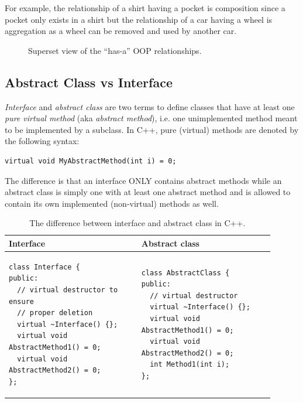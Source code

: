 \documentclass[a4paper]{article}
\begin{document}
For example, the relationship of a shirt having a pocket is composition since a pocket only exists in a shirt but the relationship of a car having a wheel is aggregation as a wheel can be removed and used by another car.

\begin{figure}[ht]
  \centering
  \caption{Superset view of the ``has-a'' OOP relationships.} \label{fig:oop_hasa_superset}
\end{figure}


\subsection{Abstract Class vs Interface}

\textit{Interface} and \textit{abstract class} are two terms to define classes that have at least one \textit{pure virtual method} (aka \textit{abstract method}), i.e. one unimplemented method meant to be implemented by a subclass. In C++, pure (virtual) methods are denoted by the following syntax:
\begin{verbatim}
virtual void MyAbstractMethod(int i) = 0;
\end{verbatim}

The difference is that an interface ONLY contains abstract methods while an abstract class is simply one with at least one abstract method and is allowed to contain its own implemented (non-virtual) methods as well.

\begin{table}[H]
  \centering
  \begin{tabular}{p{0.45\linewidth}|p{0.45\linewidth}}
    \textbf{Interface} & \textbf{Abstract class} \\
    \hline
        \begin{verbatim}
class Interface {
public:
  // virtual destructor to ensure
  // proper deletion
  virtual ~Interface() {};
  virtual void AbstractMethod1() = 0;
  virtual void AbstractMethod2() = 0;
};
        \end{verbatim}
        &
        \begin{verbatim}
class AbstractClass {
public:
  // virtual destructor
  virtual ~Interface() {};
  virtual void AbstractMethod1() = 0;
  virtual void AbstractMethod2() = 0;
  int Method1(int i);
};
        \end{verbatim}
        \\
    \hline
  \end{tabular}
  \caption{The difference between interface and abstract class in C++.}
  \label{tab:interface_vs_abstract_class}
\end{table}
\end{document}
